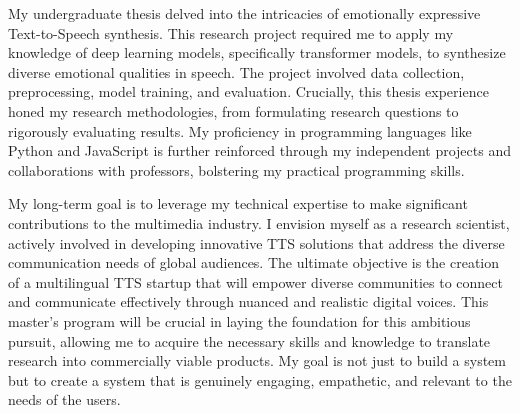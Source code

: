 \documentclass[12pt,a4paper]{article}
\begin{document}
\begin{CJK*}{UTF8}{gbsn}
My undergraduate thesis delved into the intricacies of emotionally expressive Text-to-Speech synthesis. This research project required me to apply my knowledge of deep learning models, specifically transformer models, to synthesize diverse emotional qualities in speech. The project involved data collection, preprocessing, model training, and evaluation. Crucially, this thesis experience honed my research methodologies, from formulating research questions to rigorously evaluating results. My proficiency in programming languages like Python and JavaScript is further reinforced through my independent projects and collaborations with professors, bolstering my practical programming skills.\newline


My long-term goal is to leverage my technical expertise to make significant contributions to the multimedia industry. I envision myself as a research scientist, actively involved in developing innovative TTS solutions that address the diverse communication needs of global audiences. The ultimate objective is the creation of a multilingual TTS startup that will empower diverse communities to connect and communicate effectively through nuanced and realistic digital voices. This master's program will be crucial in laying the foundation for this ambitious pursuit, allowing me to acquire the necessary skills and knowledge to translate research into commercially viable products. My goal is not just to build a system but to create a system that is genuinely engaging, empathetic, and relevant to the needs of the users.\newline


\end{CJK*}
\end{document}
